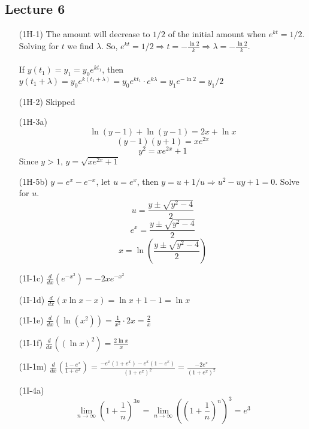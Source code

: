 \documentclass{article}
\begin{document}
\subsection{Lecture 6}
\begin{itemize}
    \item[(1H-1)] The amount will decrease to $1/2$ of the initial amount when $e^{kt} = 1/2$. Solving for $t$ we find $\lambda$. So, $e^{kt} = 1/2 \Rightarrow t = -\frac{\ln 2}{k} \Rightarrow \lambda = -\frac{\ln 2}{k}$. \\ \\
    If $y(t_1) = y_1 = y_0e^{kt_1}$, then $y(t_1+\lambda) = y_0e^{k(t_1+\lambda)} = y_0e^{kt_1} \cdot e^{k\lambda} = y_1e^{-\ln 2} = y_1/2$

    \item[(1H-2)] Skipped

    \item[(1H-3a)] 
    \[ \ln(y-1)+\ln(y-1) = 2x + \ln{x}\]
    \[ (y-1)(y+1) = xe^{2x} \]
    \[ y^2 = xe^{2x} + 1 \]
    Since $y > 1$, $y = \sqrt{xe^{2x} + 1}$

    \item[(1H-5b)] $y = e^x - e^{-x}$, let $u = e^x$, then $y = u + 1/u \Rightarrow u^2-uy+1 = 0$. Solve for $u$.
    \[ u = \frac{y \pm \sqrt{y^2-4}}{2}\]
    \[ e^x =  \frac{y \pm \sqrt{y^2-4}}{2} \]
    \[ x = \ln \left( \frac{y \pm \sqrt{y^2-4}}{2} \right) \]

    \item[(1I-1c)] $\frac{d}{dx} \left( e^{-x^2} \right) = -2xe^{-x^2}$

    \item[(1I-1d)] $\frac{d}{dx} \left( x \ln{x} - x \right) = \ln{x} + 1 - 1 = \ln{x}$

    \item[(1I-1e)] $\frac{d}{dx} \left( \ln{(x^2)} \right) = \frac{1}{x^2} \cdot 2x = \frac{2}{x}$

    \item[(1I-1f)] $\frac{d}{dx} \left( (\ln{x})^2 \right) =  \frac{2 \ln{x}}{x}$

    \item[(1I-1m)] $\frac{d}{dx} \left( \frac{1-e^x}{1+e^x} \right) = \frac{-e^x(1+e^x)-e^x(1-e^x)} {(1+e^x)^2} = \frac{-2e^x}{(1+e^x)^2}$

    \item[(1I-4a)] 
    \[ \lim_{n \to \infty} \left( 1 + \frac{1}{n} \right)^{3n} = \lim_{n \to \infty} \left( \left( 1 + \frac{1}{n} \right)^n \right)^3 = e^3 \]
\end{itemize}
\end{document}

